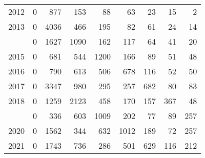 \documentclass[
]{article}
\begin{document}
\begin{longtable}[t]{lrrrrrrrr}
2012 & 0 & 877 & 153 & 88 & 63 & 23 & 15 & 2\\
2013 & 0 & 4036 & 466 & 195 & 82 & 61 & 24 & 14\\
\addlinespace
2014 & 0 & 1627 & 1090 & 162 & 117 & 64 & 41 & 20\\
2015 & 0 & 681 & 544 & 1200 & 166 & 89 & 51 & 48\\
2016 & 0 & 790 & 613 & 506 & 678 & 116 & 52 & 50\\
2017 & 0 & 3347 & 980 & 295 & 257 & 682 & 80 & 83\\
2018 & 0 & 1259 & 2123 & 458 & 170 & 157 & 367 & 48\\
\addlinespace
2019 & 0 & 336 & 603 & 1009 & 202 & 77 & 89 & 257\\
2020 & 0 & 1562 & 344 & 632 & 1012 & 189 & 72 & 257\\
2021 & 0 & 1743 & 736 & 286 & 501 & 629 & 116 & 212\\*
\end{longtable}
\end{document}
